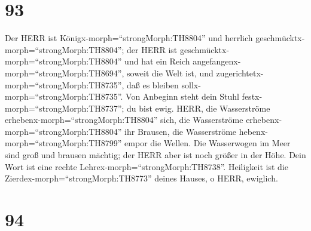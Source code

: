 \hypertarget{section-92}{%
\section{93}\label{section-92}}

 Der HERR ist Königx-morph=``strongMorph:TH8804'' und
herrlich geschmücktx-morph=``strongMorph:TH8804''; der HERR ist
geschmücktx-morph=``strongMorph:TH8804'' und hat ein Reich
angefangenx-morph=``strongMorph:TH8694'', soweit die Welt ist, und
zugerichtetx-morph=``strongMorph:TH8735'', daß es bleiben
sollx-morph=``strongMorph:TH8735''.  Von Anbeginn steht dein
Stuhl festx-morph=``strongMorph:TH8737''; du bist ewig. 
HERR, die Wasserströme erhebenx-morph=``strongMorph:TH8804'' sich, die
Wasserströme erhebenx-morph=``strongMorph:TH8804'' ihr Brausen, die
Wasserströme hebenx-morph=``strongMorph:TH8799'' empor die Wellen.
 Die Wasserwogen im Meer sind groß und brausen mächtig; der
HERR aber ist noch größer in der Höhe.  Dein Wort ist eine
rechte Lehrex-morph=``strongMorph:TH8738''. Heiligkeit ist die
Zierdex-morph=``strongMorph:TH8773'' deines Hauses, o HERR, ewiglich.

\hypertarget{section-93}{%
\section{94}\label{section-93}}

